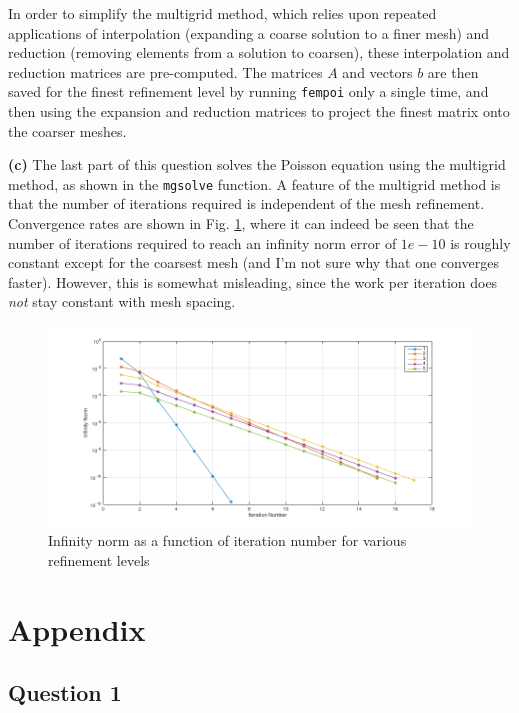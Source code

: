\documentclass[10pt]{article}
\begin{document}
In order to simplify the multigrid method, which relies upon repeated applications of interpolation (expanding a coarse solution to a finer mesh) and reduction (removing elements from a solution to coarsen), these interpolation and reduction matrices are pre-computed. The matrices \(A\) and vectors \(b\) are then saved for the finest refinement level by running {\tt fempoi} only a single time, and then using the expansion and reduction matrices to project the finest matrix onto the coarser meshes.

\textbf{(c)}
The last part of this question solves the Poisson equation using the multigrid method, as shown in the {\tt mgsolve} function. A feature of the multigrid method is that the number of iterations required is independent of the mesh refinement. Convergence rates are shown in Fig. \ref{fig:question2c}, where it can indeed be seen that the number of iterations required to reach an infinity norm error of \(1e-10\) is roughly constant except for the coarsest mesh (and I'm not sure why that one converges faster). However, this is somewhat misleading, since the work per iteration does {\it not} stay constant with mesh spacing.

\begin{figure}[H]
\centering
\includegraphics[width=1.0\textwidth]{figures/question2c.png}
\caption{Infinity norm as a function of iteration number for various refinement levels}
\label{fig:question2c}
\end{figure}










\section{Appendix}
\subsection{Question 1}
\end{document}
